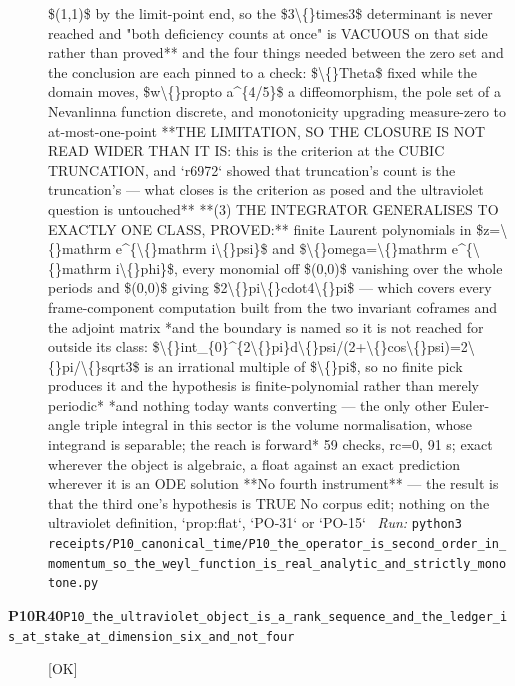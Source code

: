 \begin{description}
\$(1,1)\$ by the limit-point end, so the \$3\textbackslash\{\}times3\$ determinant is never reached and "both deficiency counts at once" is VACUOUS on that side rather than proved**  and the four things needed between the zero set and the conclusion are each pinned to a check: \$\textbackslash\{\}Theta\$ fixed while the domain moves, \$w\textbackslash\{\}propto a\textasciicircum{}\{4/5\}\$ a diffeomorphism, the pole set of a Nevanlinna function discrete, and monotonicity upgrading measure-zero to at-most-one-point  **THE LIMITATION, SO THE CLOSURE IS NOT READ WIDER THAN IT IS: this is the criterion at the CUBIC TRUNCATION, and `r6972` showed that truncation's count is the truncation's --- what closes is the criterion as posed and the ultraviolet question is untouched**  **(3) THE INTEGRATOR GENERALISES TO EXACTLY ONE CLASS, PROVED:** finite Laurent polynomials in \$z=\textbackslash\{\}mathrm e\textasciicircum{}\{\textbackslash\{\}mathrm i\textbackslash\{\}psi\}\$ and \$\textbackslash\{\}omega=\textbackslash\{\}mathrm e\textasciicircum{}\{\textbackslash\{\}mathrm i\textbackslash\{\}phi\}\$, every monomial off \$(0,0)\$ vanishing over the whole periods and \$(0,0)\$ giving \$2\textbackslash\{\}pi\textbackslash\{\}cdot4\textbackslash\{\}pi\$ --- which covers every frame-component computation built from the two invariant coframes and the adjoint matrix  *and the boundary is named so it is not reached for outside its class: \$\textbackslash\{\}int\_\{0\}\textasciicircum{}\{2\textbackslash\{\}pi\}d\textbackslash\{\}psi/(2+\textbackslash\{\}cos\textbackslash\{\}psi)=2\textbackslash\{\}pi/\textbackslash\{\}sqrt3\$ is an irrational multiple of \$\textbackslash\{\}pi\$, so no finite pick produces it and the hypothesis is finite-polynomial rather than merely periodic*  *and nothing today wants converting --- the only other Euler-angle triple integral in this sector is the volume normalisation, whose integrand is separable; the reach is forward*  59 checks, rc=0, 91 s; exact wherever the object is algebraic, a float against an exact prediction wherever it is an ODE solution  **No fourth instrument** --- the result is that the third one's hypothesis is TRUE  No corpus edit; nothing on the ultraviolet definition, `prop:flat`, `PO-31` or `PO-15`
\ \emph{Run:} \texttt{python3 receipts/P10\_canonical\_time/P10\_the\_operator\_is\_second\_order\_in\_momentum\_so\_the\_weyl\_function\_is\_real\_analytic\_and\_strictly\_monotone.py}
\item[\rcptlabel{P10_the_ultraviolet_object_is_a_rank_sequence_and_the_ledger_is_at_stake_at_dimension_six_and_not_four}{P10R40}\textbf{P10R40}\quad\texttt{P10\_the\_ultraviolet\_object\_is\_a\_rank\_sequence\_and\_the\_ledger\_is\_at\_stake\_at\_dimension\_six\_and\_not\_four}]\hfill\textsf{[OK]}\\

\end{description}
